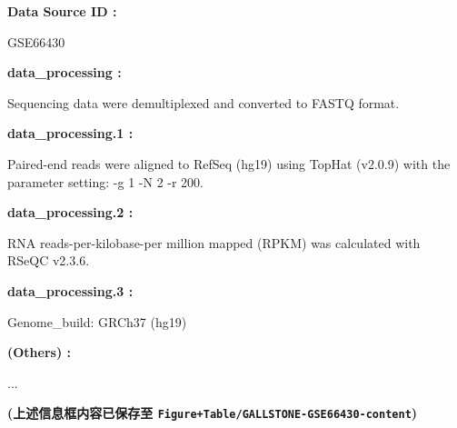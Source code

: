\documentclass[
]{article}
\begin{document}
\begin{center}\begin{tcolorbox}[colback=gray!10, colframe=gray!50, width=0.9\linewidth, arc=1mm, boxrule=0.5pt]
\textbf{
Data Source ID
:}

\vspace{0.5em}

    GSE66430

\vspace{2em}


\textbf{
data\_processing
:}

\vspace{0.5em}

    Sequencing data were demultiplexed and converted to
FASTQ format.

\vspace{2em}


\textbf{
data\_processing.1
:}

\vspace{0.5em}

    Paired-end reads were aligned to RefSeq (hg19) using
TopHat (v2.0.9) with the parameter setting: -g 1 -N 2 -r
200.

\vspace{2em}


\textbf{
data\_processing.2
:}

\vspace{0.5em}

    RNA reads-per-kilobase-per million mapped (RPKM) was
calculated with RSeQC v2.3.6.

\vspace{2em}


\textbf{
data\_processing.3
:}

\vspace{0.5em}

    Genome\_build: GRCh37 (hg19)

\vspace{2em}


\textbf{
(Others)
:}

\vspace{0.5em}

    ...

\vspace{2em}
\end{tcolorbox}
\end{center}

\textbf{(上述信息框内容已保存至 \texttt{Figure+Table/GALLSTONE-GSE66430-content})}

\begin{center}\vspace{1.5cm}\end{center}
\end{document}
